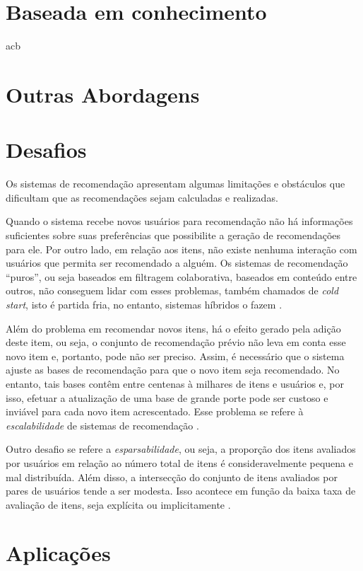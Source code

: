\section{Baseada em conhecimento}
    acb
    
\section{Outras Abordagens}
    
\section{Desafios}
    
    Os sistemas de recomendação apresentam algumas limitações e obstáculos que dificultam que as recomendações sejam calculadas e realizadas. 
    
    Quando o sistema recebe novos usuários para recomendação não há informações suficientes sobre suas preferências que possibilite a geração de  recomendações para ele. Por outro lado, em relação aos itens, não existe nenhuma interação com usuários que permita ser recomendado a alguém. Os sistemas de recomendação ``puros'', ou seja baseados em filtragem colaborativa, baseados em conteúdo entre outros, não conseguem lidar com esses problemas, também chamados de \textit{cold start}, isto é partida fria, no entanto, sistemas híbridos o fazem \cite{Miranda2010}.
    
    Além do problema em recomendar novos itens, há o efeito gerado pela adição deste item, ou seja, o conjunto de recomendação prévio não leva em conta esse novo item e, portanto, pode não ser preciso. Assim, é necessário que o sistema ajuste as bases de recomendação para que o novo item seja recomendado. No entanto, tais bases contêm entre centenas à milhares de itens e usuários e, por isso, efetuar a atualização de uma base de grande porte pode ser custoso e inviável para cada novo item acrescentado. Esse problema se refere à \textit{escalabilidade} de sistemas de recomendação \cite{Lue2012}. 
    
    Outro desafio se refere a \textit{esparsabilidade}, ou seja, a proporção dos itens avaliados por usuários em relação ao número total de itens é consideravelmente pequena e mal distribuída. Além disso, a intersecção do conjunto de itens avaliados por pares de usuários tende a ser modesta. Isso acontece em função da baixa taxa de avaliação de itens, seja explícita ou implicitamente \cite{Lue2012}.


\section{Aplicações}


